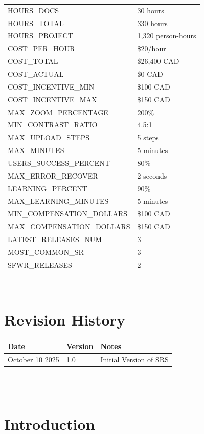 \documentclass[12pt]{article}
\begin{document}
\begin{tabularx}{\textwidth}{|X|X|}
HOURS\_DOCS & 30 hours \\
HOURS\_TOTAL & 330 hours \\
HOURS\_PROJECT & 1,320 person-hours \\
COST\_PER\_HOUR & \$20/hour \\
COST\_TOTAL & \$26,400 CAD \\
COST\_ACTUAL & \$0 CAD \\
COST\_INCENTIVE\_MIN & \$100 CAD \\
COST\_INCENTIVE\_MAX & \$150 CAD \\
MAX\_ZOOM\_PERCENTAGE & 200\%\\
MIN\_CONTRAST\_RATIO & 4.5:1\\
MAX\_UPLOAD\_STEPS & 5 steps\\
MAX\_MINUTES & 5 minutes\\
USERS\_SUCCESS\_PERCENT & 80\%\\
MAX\_ERROR\_RECOVER & 2 seconds \\
LEARNING\_PERCENT & 90\% \\
MAX\_LEARNING\_MINUTES & 5 minutes \\
MIN\_COMPENSATION\_DOLLARS & \$100 CAD \\ 
MAX\_COMPENSATION\_DOLLARS & \$150 CAD \\ 
LATEST\_RELEASES\_NUM & 3 \\
MOST\_COMMON\_SR & 3 \\
SFWR\_RELEASES & 2 \\


\bottomrule
\end{tabularx}


~\newpage

\section*{Revision History}

\begin{tabularx}{\textwidth}{p{3cm}p{2cm}X}
  \toprule {\textbf{Date}} & {\textbf{Version}} & {\textbf{Notes}}\\
  \midrule
  October 10 2025 & 1.0 & Initial Version of SRS\\
  \bottomrule
\end{tabularx}

~\\

~\newpage
\section{Introduction}
\end{document}
